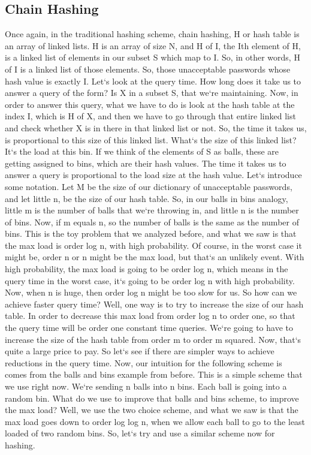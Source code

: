 \subsection{Chain Hashing}
Once again, in the traditional hashing scheme, chain hashing, H or hash table is an array of linked lists.
H is an array of size N, and H of I, the Ith element of H, is a linked list of elements in our subset S which map to I\@.
So, in other words, H of I is a linked list of those elements.
So, those unacceptable passwords whose hash value is exactly I\@.
Let`s look at the query time.
How long does it take us to answer a query of the form? Is X in a subset S, that we`re maintaining.
Now, in order to answer this query, what we have to do is look at the hash table at the index I, which is H of X, and then we have to go through that entire linked list and check whether X is in there in that linked list or not.
So, the time it takes us, is proportional to this size of this linked list.
What`s the size of this linked list? It`s the load at this bin.
If we think of the elements of S as balls, these are getting assigned to bins, which are their hash values.
The time it takes us to answer a query is proportional to the load size at the hash value.
Let`s introduce some notation.
Let M be the size of our dictionary of unacceptable passwords, and let little n, be the size of our hash table.
So, in our balls in bins analogy, little m is the number of balls that we`re throwing in, and little n is the number of bins.
Now, if m equals n, so the number of balls is the same as the number of bins.
This is the toy problem that we analyzed before, and what we saw is that the max load is order log n, with high probability.
Of course, in the worst case it might be, order n or n might be the max load, but that`s an unlikely event.
With high probability, the max load is going to be order log n, which means in the query time in the worst case, it`s going to be order log n with high probability.
Now, when n is huge, then order log n might be too slow for us.
So how can we achieve faster query time? Well, one way is to try to increase the size of our hash table.
In order to decrease this max load from order log n to order one, so that the query time will be order one constant time queries.
We`re going to have to increase the size of the hash table from order m to order m squared.
Now, that`s quite a large price to pay.
So let`s see if there are simpler ways to achieve reductions in the query time.
Now, our intuition for the following scheme is comes from the balls and bins example from before.
This is a simple scheme that we use right now.
We`re sending n balls into n bins.
Each ball is going into a random bin.
What do we use to improve that balls and bins scheme, to improve the max load? Well, we use the two choice scheme, and what we saw is that the max load goes down to order log log n, when we allow each ball to go to the least loaded of two random bins.
So, let`s try and use a similar scheme now for hashing.

